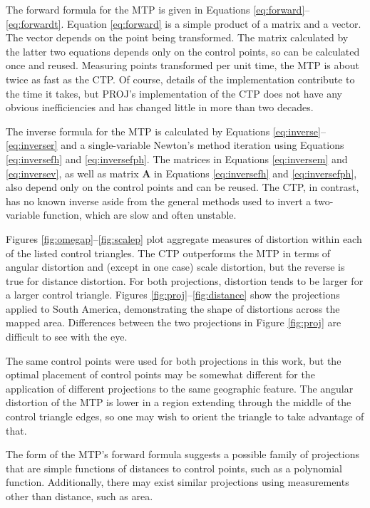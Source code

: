 \documentclass[]{interact}
\begin{document}
The forward formula for the MTP is given in Equations
\ref{eq:forward}--\ref{eq:forwardt}. Equation \ref{eq:forward} is a simple
product of a matrix and a vector. The vector depends on the point being
transformed. The matrix calculated by the latter two equations depends only on
the control points, so can be calculated once and reused. Measuring points
transformed per unit time, the MTP is about twice as fast as the CTP. Of
course, details of the implementation contribute to the time it takes, but
PROJ's implementation of the CTP does not have any obvious inefficiencies
and has changed little in more than two decades.

The inverse formula for the MTP is calculated by Equations
\ref{eq:inverse}--\ref{eq:inverser} and a single-variable Newton's method
iteration using Equations \ref{eq:inversefh} and \ref{eq:inversefph}. The
matrices in Equations \ref{eq:inversem} and \ref{eq:inversev}, as well
as matrix $\mathbf A$ in Equations \ref{eq:inversefh} and \ref{eq:inversefph},
also depend only on the control points and can be reused. The CTP,
in contrast, has no known inverse aside from the general methods used to invert
a two-variable function, which are slow and often unstable.

Figures \ref{fig:omegap}--\ref{fig:scalep} plot aggregate measures of distortion
within each of the listed control triangles. The CTP outperforms the MTP in
terms of angular distortion and (except in
one case) scale distortion, but the reverse is true for distance distortion. For
both projections, distortion tends to be larger for a larger control triangle.
Figures \ref{fig:proj}--\ref{fig:distance} show the projections applied to
South America, demonstrating the shape of distortions across the mapped area.
Differences between the two projections in Figure \ref{fig:proj} are difficult
to see with the eye.

The same control points were used for both projections in this work, but the
optimal placement of control points may be somewhat different for the
application of different projections to the same geographic feature.
The angular distortion of the MTP is lower
in a region extending through the middle of the control triangle edges,
so one may wish to orient the triangle to take advantage of that.

The form of the MTP's forward formula suggests a possible family of projections
that are simple functions of distances to control points, such as a polynomial
function. Additionally, there may exist similar projections using measurements
other than distance, such as area.
\end{document}
